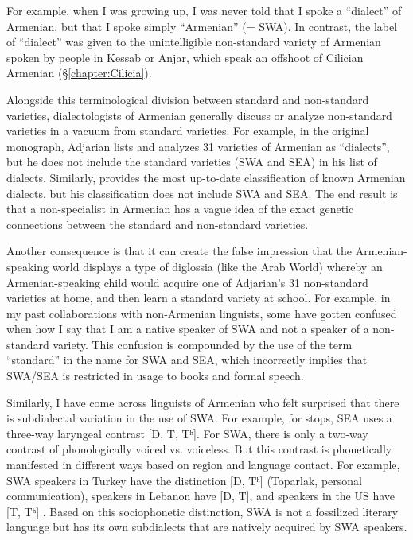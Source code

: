 \documentclass[output=paper]{langscibook}
\begin{document}
For example, when I was growing up, I was never told that I spoke a ``dialect'' of Armenian, but that I spoke simply ``Armenian'' (= SWA). In contrast, the label of ``dialect'' was given to the unintelligible non-standard variety of Armenian spoken by people in Kessab or Anjar, which speak an offshoot of Cilician Armenian (\S\ref{chapter:Cilicia}).



Alongside this terminological division between standard and non-standard varieties, dialectologists of Armenian generally discuss or analyze non-standard varieties in a vacuum from standard varieties. For example, in the original monograph, Adjarian lists and analyzes 31 varieties of Armenian as ``dialects'', but he does not include the standard varieties (SWA and SEA) in his list of dialects. Similarly, \citet{Martirosyan-2019-Armeniandialects,Martirosyan-2019-ArmenianDialectsBigVersionRussianJournal} provides the most up-to-date classification of known Armenian dialects, but  his classification does not include SWA and SEA. The end result is that a non-specialist in Armenian has a vague idea of the exact genetic connections between the standard and non-standard varieties.

Another consequence is that it can create the false impression that the Armenian\hyp speaking world displays a type of diglossia (like the Arab World) whereby an Armenian\hyp speaking child would acquire one of Adjarian's 31 non-standard varieties at home, and then learn a standard variety at school. For example, in my past collaborations with non\hyp Armenian linguists, some have gotten confused when how I say that I am a native speaker of SWA and not a speaker of a non-standard variety. This confusion is compounded by the use of the  term ``standard'' in the name for SWA and SEA, which incorrectly implies that SWA/SEA is restricted in usage to books and formal speech.

Similarly, I have come across linguists of Armenian who felt surprised that there is subdialectal variation in the use of SWA. For example, for stops, SEA uses a three-way laryngeal contrast [D, T, Tʰ]. For SWA, there is only a two-way contrast of phonologically voiced vs. voiceless. But this contrast is phonetically manifested in different ways based on region and language contact. For example, SWA speakers in Turkey have the distinction [D, Tʰ] (Toparlak, personal communication), speakers in Lebanon have [D, T], and speakers in the US have [T, Tʰ] \citep{kellyKeshishian-2021-VoicingWesternArmenian}. Based on this sociophonetic distinction,    SWA is not a fossilized literary language but has its own subdialects that are natively acquired by SWA speakers.  
\end{document}
